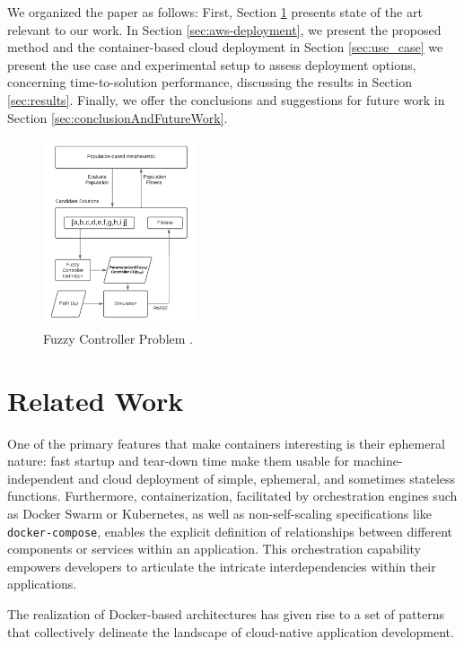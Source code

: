 \documentclass{cys}
\begin{document}
We organized the paper as follows: First, Section \ref{sec:relatedWork} presents state of the art relevant to our work. 
In Section \ref{sec:aws-deployment}, we present the proposed method and the container-based
cloud deployment in Section \ref{sec:use_case} we present the use case and experimental setup to assess 
deployment options, concerning time-to-solution performance, discussing  the results in Section \ref{sec:results}. 
Finally, we offer the conclusions and suggestions for future work in Section \ref{sec:conclusionAndFutureWork}.

\begin{figure}[ht]
\centering
\includegraphics[width=0.4\textwidth]{fisopt}
\caption{Fuzzy Controller Problem \cite{mancilla2022tracking}.}
\label{fig:Eval}
\end{figure}


\section{Related Work}
\label{sec:relatedWork}
One of the primary features that make containers interesting is their
ephemeral nature: fast startup and tear-down time make them usable for
machine-independent and cloud deployment of simple, ephemeral, and
sometimes stateless functions. 
Furthermore, containerization, facilitated by orchestration engines 
such as Docker Swarm or Kubernetes, as well as non-self-scaling 
specifications like {\tt docker-compose}, enables the explicit 
definition of relationships between different components or services 
within an application. This orchestration capability empowers 
developers to articulate the intricate interdependencies within their applications.

The realization of Docker-based architectures \cite{kratzke2017understanding} has
given rise to a set of patterns that collectively delineate the landscape of
cloud-native application development. 
\end{document}

